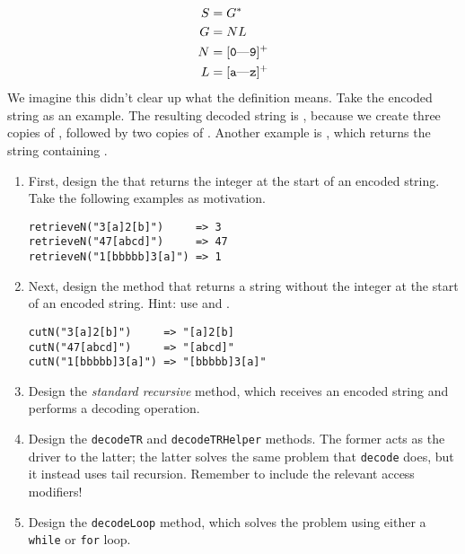 \begin{align*}
S &= G^{*}\\
G &= NL\\
N &= [\text{\ttt{0}---\ttt{9}}]^{+}\\
L &= [\text{\ttt{a}---\ttt{z}}]^{+}
\end{align*}
We imagine this didn't clear up what the definition means. Take the encoded string  as an example. The resulting decoded string is , because we create three copies of , followed by two copies of . Another example is , which returns the string containing .

\begin{enumerate}[label=(\alph*)]
    \item First, design the  that returns the integer at the start of an encoded string. Take the following examples as motivation.
\begin{verbatim}
retrieveN("3[a]2[b]")     => 3
retrieveN("47[abcd]")     => 47
retrieveN("1[bbbbb]3[a]") => 1
\end{verbatim}
    \item Next, design the  method that returns a string without the integer at the start of an encoded string. Hint: use  and .
\begin{verbatim}
cutN("3[a]2[b]")     => "[a]2[b]
cutN("47[abcd]")     => "[abcd]"
cutN("1[bbbbb]3[a]") => "[bbbbb]3[a]"
\end{verbatim}
    \item Design the \emph{standard recursive}  method, which receives an encoded string and performs a decoding operation.
    \item Design the \texttt{decodeTR} and \texttt{decodeTRHelper} methods. The former acts as the driver to the latter; the latter solves the same problem that \texttt{decode} does, but it instead uses tail recursion. Remember to include the relevant access modifiers!
    \item Design the \texttt{decodeLoop} method, which solves the problem using either a \texttt{while} or \texttt{for} loop.
\end{enumerate}


